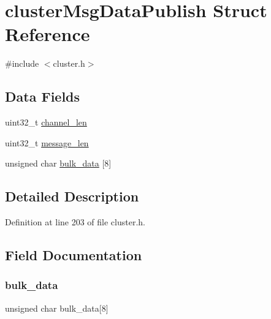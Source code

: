 \hypertarget{structcluster_msg_data_publish}{}\section{cluster\+Msg\+Data\+Publish Struct Reference}
\label{structcluster_msg_data_publish}


{\ttfamily \#include $<$cluster.\+h$>$}

\subsection*{Data Fields}
\begin{DoxyCompactItemize}
\item 
uint32\+\_\+t \hyperlink{structcluster_msg_data_publish_a68bdef8eb0f6ccd540668a828d29492a}{channel\+\_\+len}
\item 
uint32\+\_\+t \hyperlink{structcluster_msg_data_publish_a619a2b4c8e952645f4d7aa4b229fe3d9}{message\+\_\+len}
\item 
unsigned char \hyperlink{structcluster_msg_data_publish_a259bf56ee2c4c8d4450e071720d7d615}{bulk\+\_\+data} \mbox{[}8\mbox{]}
\end{DoxyCompactItemize}


\subsection{Detailed Description}


Definition at line 203 of file cluster.\+h.



\subsection{Field Documentation}
\mbox{\label{structcluster_msg_data_publish_a259bf56ee2c4c8d4450e071720d7d615}} 
\subsubsection{\texorpdfstring{bulk\+\_\+data}{bulk\_data}}
{\footnotesize\ttfamily unsigned char bulk\+\_\+data\mbox{[}8\mbox{]}}



